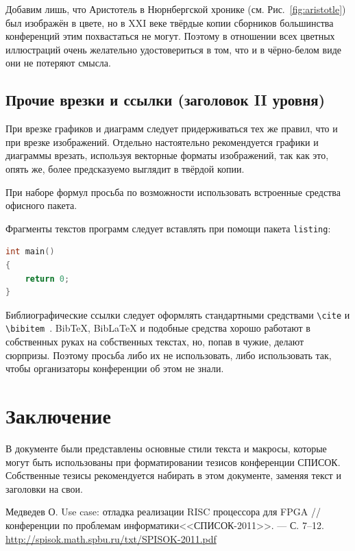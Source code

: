\documentclass{spisok-article}
\begin{document}
Добавим лишь, что Аристотель в Нюрнбергской хронике
(см. Рис.~\ref{fig:aristotle}) был изображён в цвете, но в XXI веке
твёрдые копии сборников большинства конференций этим похвастаться не
могут. Поэтому в отношении всех цветных иллюстраций очень желательно
удостовериться в том, что и в чёрно-белом виде они не потеряют смысла.

\subsection{Прочие врезки и ссылки (заголовок II уровня)}

При врезке графиков и диаграмм следует придерживаться тех же правил,
что и при врезке изображений. Отдельно настоятельно рекомендуется
графики и диаграммы врезать, используя векторные форматы изображений,
так как это, опять же, более предсказуемо выглядит в твёрдой копии.

При наборе формул просьба по возможности использовать встроенные
средства офисного пакета.

Фрагменты текстов программ следует вставлять при помощи пакета
\texttt{listing}:

\begin{lstlisting}[language=C]
int main()
{
    return 0;
}
\end{lstlisting}

Библиографические ссылки следует оформлять стандартными средствами
\texttt{\textbackslash{}cite} и
\texttt{\textbackslash{}bibitem}~\cite{medvedev2011}. BibTeX, BibLaTeX
и подобные средства хорошо работают в собственных руках на собственных
текстах, но, попав в чужие, делают сюрпризы.  Поэтому просьба либо их
не использовать, либо использовать так, чтобы организаторы конференции
об этом не знали.

\section{Заключение}

В документе были представлены основные стили текста и макросы, которые
могут быть использованы при форматировании тезисов конференции СПИСОК.
Собственные тезисы рекомендуется набирать в этом документе, заменяя
текст и заголовки на свои.

\makeatletter\renewcommand{\refname}{\intl@references}\makeatother
\begin{thebibliography}{8}

 Медведев О. Use case: отладка реализации RISC
  процессора для FPGA // %
  конференции по проблемам информатики<<СПИСОК-2011>>. --- %
  С. 7--12.
  \href{http://spisok.math.spbu.ru/txt/SPISOK-2011.pdf}{http://spisok.math.spbu.ru/txt/SPISOK-2011.pdf}

\end{thebibliography}
\end{document}
